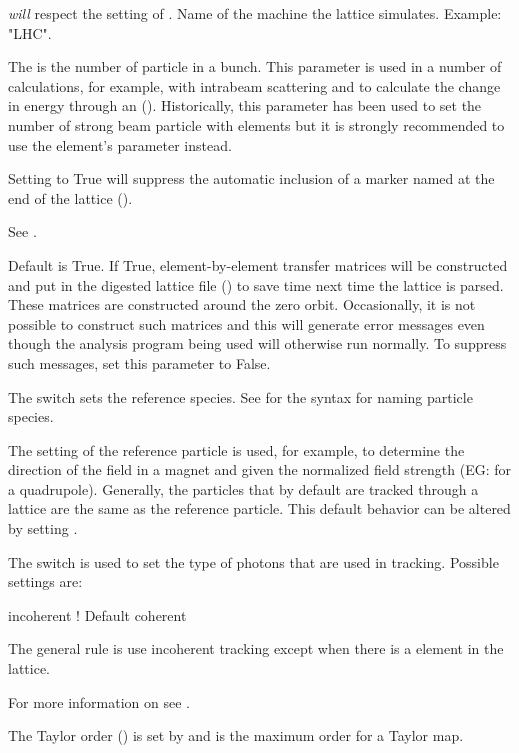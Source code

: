 \begin{description}
{\em will} respect the setting of .
%
Name of the machine the lattice simulates. Example: "LHC".
%
  \item[{parameter[n_part]}] \Newline
The  is the number of particle in a bunch. This parameter is used in a number
of calculations, for example, with intrabeam scattering and to calculate the change in energy
through an  (). Historically, this parameter has been used to set the
number of strong beam particle with  elements but it is strongly recommended to use
the  element's  parameter instead.
%
  \item[{parameter[no_end_marker]}] \Newline
Setting  to True will suppress the automatic inclusion
of a marker named  at the end of the lattice (). 
%
  \item[{parameter[p0c]}] \Newline
See .
%
  \item[{parameter[parser_make_xfer_mats]}] \Newline
Default is True. If True, element-by-element transfer matrices will be constructed and put in the
digested lattice file () to save time next time the lattice is parsed. These
matrices are constructed around the zero orbit.  Occasionally, it is not possible to construct such
matrices and this will generate error messages even though the analysis program being used will
otherwise run normally. To suppress such messages, set this parameter to False.
%
  \item[{parameter[particle]}] \Newline
The  switch sets the reference species. See  for the
syntax for naming particle species.

The setting of the reference particle is used, for example, to determine the direction of the field
in a magnet and given the normalized field strength (EG:  for a quadrupole).  Generally, the
particles that by default are tracked through a lattice are the same as the reference particle. This
default behavior can be altered by setting .

%
  \item[{parameter[photon_type]}] \Newline
The  switch is used to set the type of photons that are used in tracking. Possible
settings are:
\begin{example}
  incoherent    ! Default
  coherent 
\end{example}
The general rule is use incoherent tracking except when there is a  element in
the lattice.
%
  \item[{parameter[ran_seed]}] \Newline
For more information on  see .
%
  \item[{parameter[taylor_order]}] \Newline
The Taylor order () is set by  and is the maximum
order for a Taylor map.
  \end{description}

